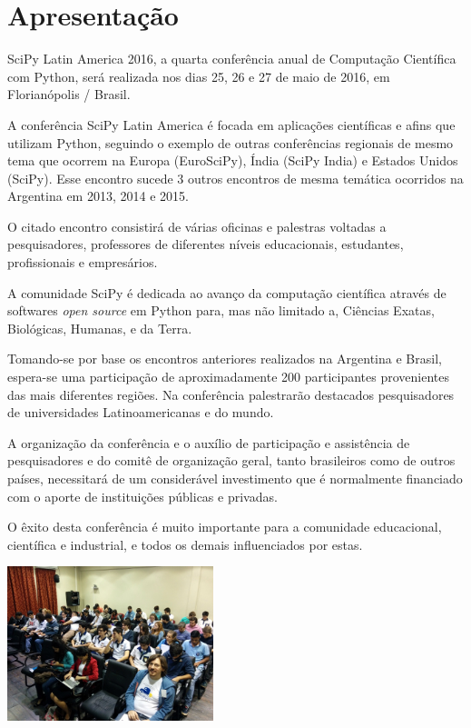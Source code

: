 \documentclass[a4paper,twocolumn,openright,article]{memoir}
\begin{document}
\clearpage

\restoregeometry
\pagestyle{plain} %
\setcounter{page}{2}
\tableofcontents*

\chapter*{Apresentação}

SciPy Latin America 2016, a quarta conferência anual de Computação Científica com Python, será realizada nos dias 25, 26 e 27 de maio de 2016, em Florianópolis / Brasil.

A conferência SciPy Latin America é focada em aplicações científicas e afins que
utilizam Python, seguindo o exemplo de outras conferências regionais de mesmo tema que ocorrem na Europa (EuroSciPy), Índia (SciPy India) e Estados Unidos (SciPy). Esse encontro sucede 3 outros encontros de mesma temática ocorridos na Argentina em 2013, 2014 e 2015.

O citado encontro consistirá de várias oficinas e palestras voltadas a pesquisadores, professores de diferentes níveis educacionais, estudantes, profissionais e empresários.

A comunidade SciPy é dedicada ao avanço da computação científica através de softwares \emph{open source} em Python para, mas não limitado a, Ciências Exatas, Biológicas, Humanas, e da Terra.

Tomando-se por base os encontros anteriores realizados na Argentina e Brasil, espera-se uma participação de aproximadamente 200 participantes provenientes das mais diferentes regiões. Na conferência palestrarão destacados pesquisadores de universidades Latinoamericanas e do mundo.

A organização da conferência e o auxílio de participação e assistência de pesquisadores e do comitê de organização geral, tanto brasileiros como de outros países, 
necessitará de
%
um considerável investimento que é normalmente financiado com o aporte de instituições públicas e privadas. 

O êxito desta conferência é muito importante para a comunidade educacional, científica e industrial, e todos os demais influenciados por estas.

\ifprint
\else
	\begin{center}
		\includegraphics[width=6cm]{imagens/IMG_20150521_102157-small.jpg}
	\end{center}
\fi
\end{document}
